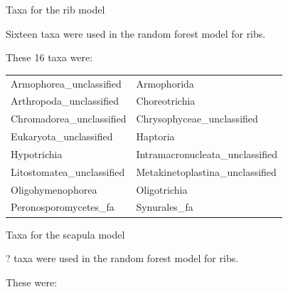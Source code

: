 \documentclass{beamer}
\begin{document}
\begin{frame}{Taxa for the rib model}

  {\footnotesize
    
  \noindent  Sixteen taxa were used in the random forest model for ribs.
  
  \vspace{0.1in}

  \noindent These 16 taxa were:
  
  \vspace{0.05in}

  \begin{tabular}{ll}
    Armophorea\_unclassified & Armophorida \\
    Arthropoda\_unclassified & Choreotrichia\\
    Chromadorea\_unclassified & Chrysophyceae\_unclassified\\
    Eukaryota\_unclassified & Haptoria\\
    Hypotrichia & Intramacronucleata\_unclassified\\
    Litostomatea\_unclassified & Metakinetoplastina\_unclassified\\
    Oligohymenophorea & Oligotrichia\\
    Peronosporomycetes\_fa & Synurales\_fa
  \end{tabular}
  }

\end{frame}



\begin{frame}{Taxa for the scapula model}

  {\footnotesize
    
  \noindent  ? taxa were used in the random forest model for ribs.
  
  \vspace{0.1in}

  \noindent These were:\\
  \begin{tabular}{ll}

  \end{tabular}
  }

\end{frame}
\end{document}
